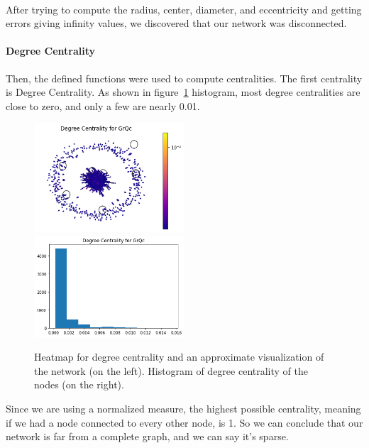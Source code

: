 \documentclass[letterpaper, 11pt]{article}
\newcommand{\1}{\mathds{1}}	%
\theoremstyle{definition}
\begin{document}
\paragraph{}After trying to compute the radius, center, diameter, and eccentricity and getting errors giving infinity values, we discovered that our network was disconnected.
\paragraph{Degree Centrality}Then, the defined functions were used to compute centralities. The first centrality is Degree Centrality. As shown in figure~\ref{fig:d_cent} histogram, most degree centralities are close to zero, and only a few are nearly 0.01. 
\begin{figure}[h]
\includegraphics[width=0.5\textwidth]{GrQc_d_cent.png}
\includegraphics[width=0.5\textwidth]{GrQc_d_cent_hist.png}
\captionsetup{justification=centering,margin=0.5cm}
\caption{Heatmap for degree centrality and an approximate visualization of the network (on the left). Histogram of degree centrality of the nodes (on the right).}
\label{fig:d_cent}
\end{figure}
Since we are using a normalized measure, the highest possible centrality, meaning if we had a node connected to every other node, is 1. So we can conclude that our network is far from a complete graph, and we can say it's sparse.
\end{document}
